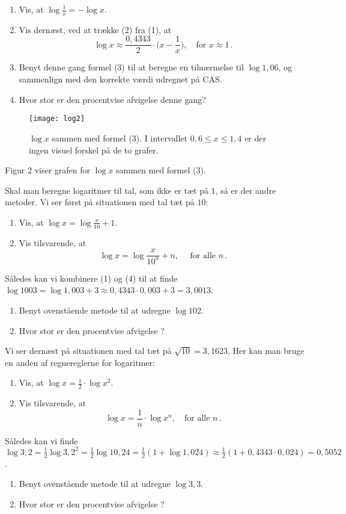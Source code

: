 \documentclass[12pt,oneside,a4paper]{article}
\theoremstyle{plain}
\begin{document}
\begin{enumerate}[label=(\alph*), resume]
    \item Vis, at $\log\frac1x = -\log x$.
    \item Vis dernæst, ved at trække (2) fra (1), at 
        \[
            \tag{3}
            \log x \approx \frac{0,4343}{2} \cdot \Big(x-\frac1x\Big),\quad
            \mbox{for $x\approx 1$}\,.
            \]
    \item Benyt denne gang formel (3) til at beregne en tilnærmelse til $\log
        1,06$, og sammenlign med den korrekte værdi udregnet på CAS.
    \item Hvor stor er den procentvise afvigelse denne gang?
\end{enumerate}
\begin{figure}[ht]
    \centering
    \texttt{[image: log2]}
    \caption{$\log x$ sammen med formel (3). I intervallet $0,6\le x \le 1,4$ er der ingen
    visuel forskel på de to grafer.}
    \label{log2}
\end{figure}
Figur 2 viser grafen for $\log x$ sammen med formel (3).

Skal man beregne logaritmer til tal, som ikke er tæt på 1, så er der andre metoder.
Vi ser først på situationen med tal tæt på $10$:

\begin{enumerate}[label=(\alph*), resume]
    \item Vis, at $\log x = \log\frac{x}{10} + 1$.
    \item Vis tilsvarende, at 
        \[
            \tag{4}
            \log x = \log\frac{x}{10^n} + n,\quad\mbox{ for alle $n$}\,.
        \]

\end{enumerate}
Således kan vi kombinere (1) og (4) til at finde $\log 1003 = \log 1,003 + 3
\approx 0,4343\cdot 0,003 + 3 = 3,0013$.
\begin{enumerate}[label=(\alph*), resume]
    \item Benyt ovenstående metode til at udregne $\log 102$.
    \item Hvor stor er den procentvise afvigelse ?
\end{enumerate}

Vi ser dernæst på situationen med tal tæt på $\sqrt{10} = 3,1623$, Her kan man
bruge en anden af regnereglerne for logaritmer:
\begin{enumerate}[label=(\alph*), resume]
    \item Vis, at $\log x = \frac12 \cdot \log x^2$.
    \item Vis tilsvarende, at
        \[
            \tag{5}
            \log x = \frac1n \cdot \log x^n,\quad \mbox{for alle $n$}\,.
        \]
\end{enumerate}
Således kan vi finde $\log 3,2 = \frac12 \log 3,2^2 = \frac12 \log 10,24
 = \frac12 (1 + \log 1,024) \approx \frac12 (1 + 0,4343\cdot 0,024)
 = 0,5052$.
\begin{enumerate}[label=(\alph*), resume]
    \item Benyt ovenstående metode til at udregne $\log 3,3$.
    \item Hvor stor er den procentvise afvigelse ?
\end{enumerate}
\end{document}
